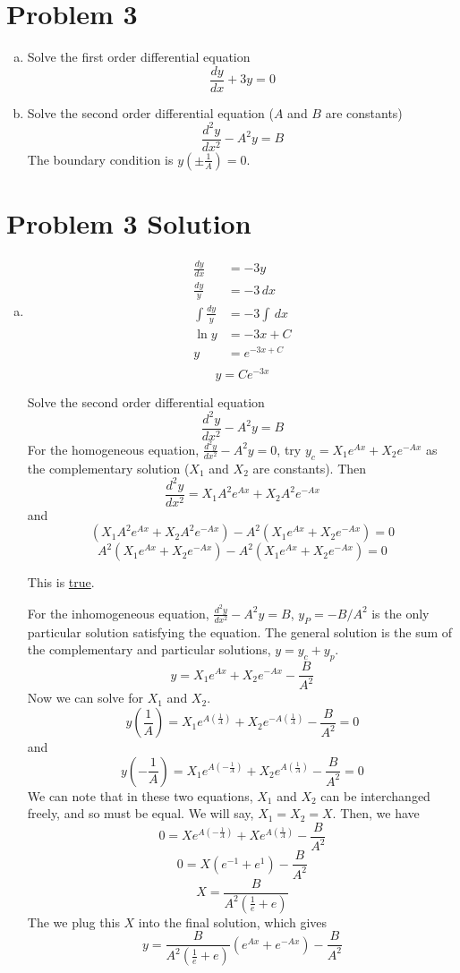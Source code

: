 \documentclass{report}
\begin{document}
\newpage
\section*{Problem 3}

\begin{enumerate}[a)]
\item Solve the first order differential equation
$$ \frac{dy}{dx} + 3y = 0 $$
\item Solve the second order differential equation ($A$ and $B$ are constants)
$$ \frac{d^2 y}{dx^2} - A^2y = B $$
The boundary condition is $y(\pm\frac{1}{A}) = 0$.
\end{enumerate}



\section*{Problem 3 Solution}
\begin{enumerate}[a)]
\item 
\begin{align}
\frac{dy}{dx}	&= -3y \\
\frac{dy}{y} 	& = -3\,dx \\
\int\frac{dy}{y}&= -3 \int \,dx \\
\ln y			&= -3 x + C \\
y				&= e^{-3x + C} \\
\end{align}
$$\boxed{y = Ce^{-3x}}$$

Solve the second order differential equation
$$ \frac{d^2 y}{dx^2} - A^2y = B $$
For the homogeneous equation, $\frac{d^2 y}{dx^2} - A^2y = 0$, try $y_c = X_1 e^{Ax} + X_2 e^{-Ax}$ as the complementary solution ($X_1$ and $X_2$ are constants). Then
$$ \frac{d^2 y}{dx^2} = X_1 A^2 e^{Ax} + X_2 A^2 e^{-Ax} $$
and
$$ (X_1 A^2 e^{Ax} + X_2 A^2 e^{-Ax}) - A^2(X_1 e^{Ax} + X_2 e^{-Ax}) = 0 $$
$$ A^2 (X_1 e^{Ax} + X_2 e^{-Ax}) - A^2 (X_1 e^{Ax} + X_2 e^{-Ax}) = 0 $$

This is \underline{true}.

For the inhomogeneous equation, $\frac{d^2 y}{dx^2} - A^2y = B$, $y_P = -B/A^2$ is the only particular solution satisfying the equation. The general solution is the sum of the complementary and particular solutions, $y = y_c + y_p$. 
$$ y = X_1 e^{Ax} + X_2 e^{-Ax} - \frac{B}{A^2} $$
Now we can solve for $X_1$ and $X_2$. 
$$ y(\frac{1}{A}) = X_1 e^{A(\frac{1}{A})} + X_2 e^{-A(\frac{1}{A})} - \frac{B}{A^2} = 0 $$
and
$$ y(-\frac{1}{A}) = X_1 e^{A(-\frac{1}{A})} + X_2 e^{A(\frac{1}{A})} - \frac{B}{A^2} = 0 $$
We can note that in these two equations, $X_1$ and $X_2$ can be interchanged freely, and so must be equal. We will say, $X_1 = X_2 = X$. Then, we have
$$ 0 = X e^{A(-\frac{1}{A})} + X e^{A(\frac{1}{A})} - \frac{B}{A^2} $$
$$ 0 = X (e^{-1} + e^{1}) - \frac{B}{A^2} $$
$$ X = \frac{B}{A^2(\frac{1}{e} + e)} $$
The we plug this $X$ into the final solution, which gives
$$ y = \frac{B}{A^2(\frac{1}{e} + e)} (e^{Ax} + e^{-Ax}) - \frac{B}{A^2} $$
\end{enumerate}
\end{document}
